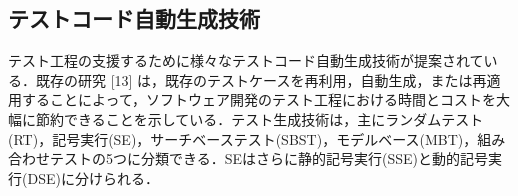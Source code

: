\documentclass[12pt]{jarticle} %
\begin{document}

\subsection{テストコード自動生成技術}
テスト工程の支援するために様々なテストコード自動生成技術が提案されている．既存の研究 [13] は，既存のテストケースを再利用，自動生成，または再適用することによって，ソフトウェア開発のテスト工程における時間とコストを大幅に節約できることを示している．テスト生成技術は，主にランダムテスト(RT)，記号実行(SE)，サーチベーステスト(SBST)，モデルベース(MBT)，組み合わせテストの5つに分類できる．SEはさらに静的記号実行(SSE)と動的記号実行(DSE)に分けられる．
\end{document}
